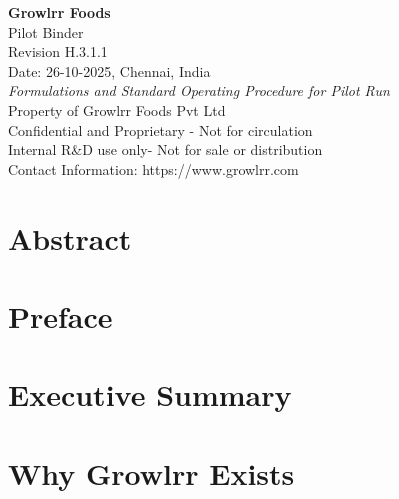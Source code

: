 \documentclass[11pt,oneside]{book}
\begin{document}
\begin{titlepage}
\centering
\vspace*{2cm}
{\Huge\bfseries Growlrr Foods}\\[0.5cm]
{\Large Pilot Binder}\\[0.3cm]
{\large Revision H.3.1.1}\\[2cm]
{\large Date: 26-10-2025, Chennai, India}\\[0.3cm]
{\large\itshape Formulations and Standard Operating Procedure for Pilot Run}\\[1cm]
\vfill
{\large Property of Growlrr Foods Pvt Ltd}\\[0.3cm]
{\large Confidential and Proprietary - Not for circulation}\\[0.3cm]
{\large Internal R\&D use only- Not for sale or distribution}\\[0.3cm]
{\large Contact Information: https://www.growlrr.com}\\[0.3cm]
\end{titlepage}

\frontmatter


\tableofcontents
\clearpage

\listoftables
\clearpage

\chapter*{Abstract}

\clearpage

\chapter*{Preface}

\clearpage

\chapter*{Executive Summary}

\clearpage

\mainmatter

\chapter{Why Growlrr Exists}

\newpage
\end{document}
